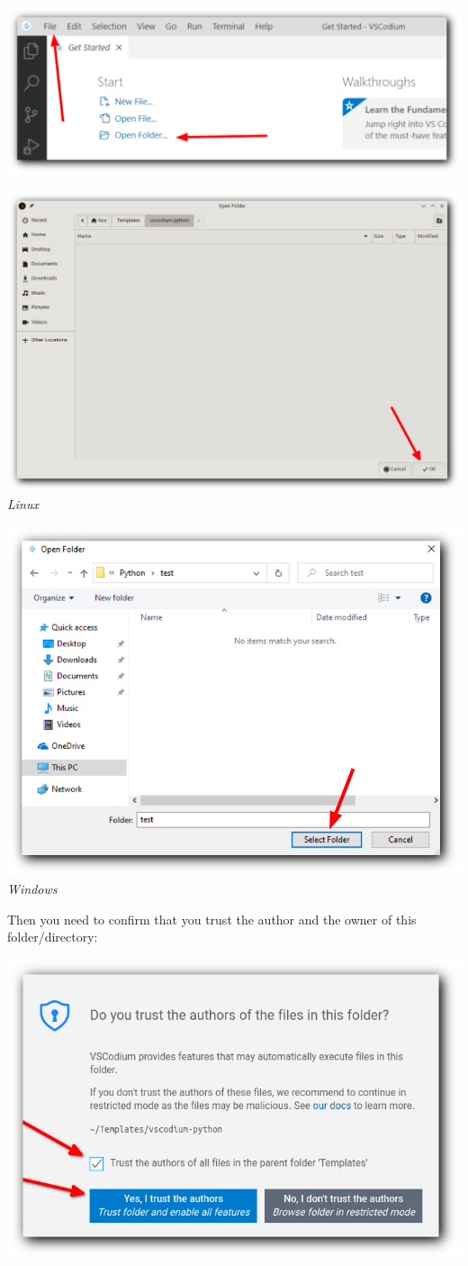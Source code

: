 \documentclass[12pt,a4paper]{article}
\begin{document}
\begin{center}
	\includegraphics[width=.9\textwidth]{shots/installation/vscodium-folder01.png}

	\begin{multicols}{2}
	\includegraphics[width=.53\textwidth]{shots/installation/vscodium-folder02.png} \\
		\textit{Linux}

	\includegraphics[width=.5\textwidth]{shots/installation/vscodium-folder02-win.png} \\
		\textit{Windows}
	\end{multicols}
\end{center}

Then you need to confirm that you trust the author
and the owner of this folder/directory:

\begin{center}
	\includegraphics[width=.7\textwidth]{shots/installation/vscodium-folder03.png}
\end{center}
\end{document}
